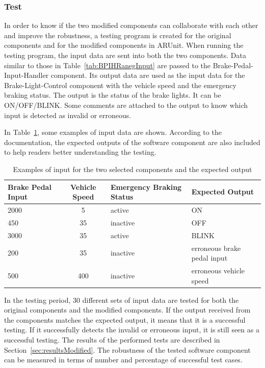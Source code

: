 \subsubsection{Test}
In order to know if the two modified components can collaborate with each other and improve the robustness, a testing program is created for the original components and for the modified components in ARUnit. When running the testing program, the input data are sent into both the two components. Data similar to those in Table~\ref{tab:BPIHRanegInput} are passed to the Brake-Pedal-Input-Handler component. Its output data are used as the input data for the Brake-Light-Control component with the vehicle speed and the emergency braking status. The output is the status of the brake lights. It can be ON/OFF/BLINK. Some comments are attached to the output to know which input is detected as invalid or erroneous. 

In Table~\ref{tab:inputData}, some examples of input data are shown. According to the documentation, the expected outputs of the software component are also included to help readers better understanding the testing. 

\begin{table}[htb]\footnotesize
\centering
\begin{tabular}{|p{1.5cm}|c|p{1.9cm}|p{1.9cm}|}\hline
Brake Pedal Input& Vehicle Speed & Emergency Braking Status & Expected Output \\ \hline
2000 & 5 & active & ON\\ \hline
450 & 35 & inactive & OFF\\ \hline
3000 & 35 & active & BLINK\\ \hline
200 & 35 & inactive & erroneous brake pedal input\\ \hline
500 & 400 & inactive & erroneous vehicle speed\\ \hline
\end{tabular}
\caption{Examples of input for the two selected components and the expected output}
\label{tab:inputData}
\vspace{-.4cm}
\end{table}


In the testing period, 30 different sets of input data are tested for both the original components and the modified components. If the output received from the components matches the expected output, it means that it is a successful testing. If it successfully detects the invalid or erroneous input, it is still seen as a successful testing. The results of the performed tests are described in Section~\ref{sec:resultsModified}. The robustness of the tested software component can be measured in terms of number and percentage of successful test cases.


